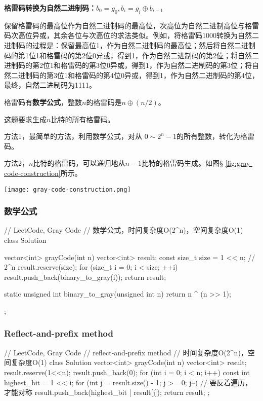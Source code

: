 \textbf{格雷码转换为自然二进制码：$b_0=g_0, b_i=g_i \oplus b_{i-1}$}

保留格雷码的最高位作为自然二进制码的最高位，次高位为自然二进制高位与格雷码次高位异或，其余各位与次高位的求法类似。例如，将格雷码1000转换为自然二进制码的过程是：保留最高位1，作为自然二进制码的最高位；然后将自然二进制码的第1位1和格雷码的第2位0异或，得到1，作为自然二进制码的第2位；将自然二进制码的第2位1和格雷码的第3位0异或，得到1，作为自然二进制码的第3位；将自然二进制码的第3位1和格雷码的第4位0异或，得到1，作为自然二进制码的第4位，最终，自然二进制码为1111。

格雷码有\textbf{数学公式}，整数$n$的格雷码是$n \oplus (n/2)$。

这题要求生成$n$比特的所有格雷码。

方法1，最简单的方法，利用数学公式，对从 $0\sim2^n-1$的所有整数，转化为格雷码。

方法2，$n$比特的格雷码，可以递归地从$n-1$比特的格雷码生成。如图\S 
\ref{fig:gray-code-construction}所示。

\begin{center}
	\texttt{[image: gray-code-construction.png]}\\
	\label{fig:gray-code-construction}
\end{center}


\subsubsection{数学公式}
\begin{Code}
	// LeetCode, Gray Code
	// 数学公式，时间复杂度O(2^n)，空间复杂度O(1)
	class Solution {
		vector<int> grayCode(int n) {
			vector<int> result;
			const size_t size = 1 << n;  // 2^n
			result.reserve(size);
			for (size_t i = 0; i < size; ++i)
				result.push_back(binary_to_gray(i));
			return result;
		}

		static unsigned int binary_to_gray(unsigned int n) {
			return n ^ (n >> 1);
		}
	};
\end{Code}

\subsubsection{Reflect-and-prefix method}
\begin{Code}
	// LeetCode, Gray Code
	// reflect-and-prefix method
	// 时间复杂度O(2^n)，空间复杂度O(1)
	class Solution {
		vector<int> grayCode(int n) {
			vector<int> result;
			result.reserve(1<<n);
			result.push_back(0);
			for (int i = 0; i < n; i++) {
				const int highest_bit = 1 << i;
				for (int j = result.size() - 1; j >= 0; j--) // 要反着遍历，才能对称
					result.push_back(highest_bit | result[j]);
			}
			return result;
		}
	};
\end{Code}

